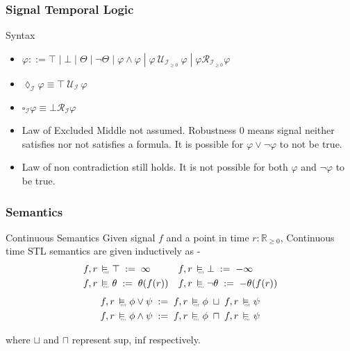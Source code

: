 \documentclass{beamer}
\newcommand{\always}[1]{\square_{#1}}
\newcommand{\eventually}[1]{\lozenge_{#1}}
\newcommand{\typeTime}{\mathbb{R}_{\geq 0}}
\newcommand{\until}{\mathcal{U}}
\newcommand{\release}{\mathcal{R}}
\newcommand{\interval}{\mathcal{I}}
\newcommand{\cont}{\raisebox{-0.1ex}{\scalebox{0.25}{\textrm{CNT}}}}
\newcommand{\contSatisfy}{\ \stackMath\stackunder[0pt]{\vDash}{\hspace*{0.3em}\cont}\ }
\newcommand{\robustAssign}{\; := \;}
\begin{document}
\begin{frame}
    \frametitle{Signal Temporal Logic}
    \begin{block}{Syntax}
        \begin{itemize}
            \item $ \varphi ::= \top \;|\; \bot \;|\; \Theta \;|\; \neg \Theta
                \; | \; \varphi \wedge \varphi \;|\; \varphi\ \until_{\interval_{\geq 0}}\ \varphi
                \; | \; \varphi \release_{\interval_{\geq 0}} \varphi $
            \item $\eventually{\interval} \varphi \equiv \top\ \until_{\interval}\ \varphi$
            \item $\always{\interval} \varphi \equiv \bot \release_{\interval} \varphi$
            \item Law of Excluded Middle not assumed. Robustness 0 means
                signal neither satisfies nor not satisfies a formula.
                It is possible for $\varphi \vee \neg \varphi$ to not
                be true.
            \item Law of non contradiction still holds. It is not possible
                for both $\varphi$ and $\neg \varphi$ to be true.
        \end{itemize}
    \end{block}
\end{frame}

\begin{frame}
    \frametitle{Semantics}
    \begin{block}{Continuous Semantics}
        Given signal $f$ and a point in time $r : \typeTime$,
        Continuous time STL semantics are given inductively as -
        \begin{align*}
              f, r &\contSatisfy \top       \robustAssign \infty &
              f, r &\contSatisfy \bot       \robustAssign -\infty \\
              f, r &\contSatisfy \theta     \robustAssign \theta(f(r)) &
              f, r &\contSatisfy \neg\theta \robustAssign -\theta(f(r)) \\
        \end{align*}
        \vspace{-1.6cm}
        \begin{align*}
            f, r \contSatisfy \phi \vee \psi  \robustAssign  f, r \contSatisfy \phi \; \sqcup \; f,r \contSatisfy \psi \\
            f, r \contSatisfy \phi \wedge \psi  \robustAssign  f, r \contSatisfy \phi \; \sqcap \; f,r \contSatisfy \psi \\
        \end{align*}
    \end{block}
    where $\sqcup$ and $\sqcap$ represent $\text{sup}$, $\text{inf}$ respectively.
\end{frame}
\end{document}
